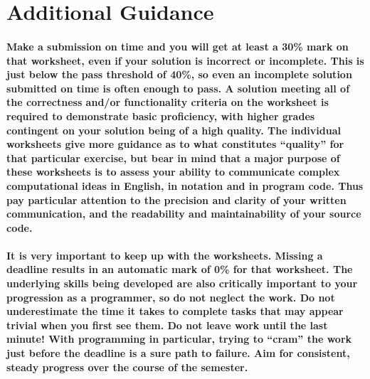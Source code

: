 \documentclass{../../fal_assignment}
\begin{document}
\paragraph{}

\section*{Additional Guidance}

\paragraph{Make a submission on time and you will get at least a 30\% mark on that worksheet,
even if your solution is incorrect or incomplete.
This is just below the pass threshold of 40\%, so even an incomplete solution submitted on time is often enough to pass.
A solution meeting all of the correctness and/or functionality criteria on the worksheet is required to demonstrate basic proficiency,
with higher grades contingent on your solution being of a high quality.
The individual worksheets give more guidance as to what constitutes ``quality'' for that particular exercise,
but bear in mind that a major purpose of these worksheets is to assess your ability to communicate
complex computational ideas in English, in notation and in program code.
Thus pay particular attention to the precision and clarity of your written communication,
and the readability and maintainability of your source code.}

\paragraph{It is very important to keep up with the worksheets. Missing a deadline results in an automatic mark of 0\% for that worksheet.
The underlying skills being developed are also critically important to your progression as a programmer, so do not neglect the work.
Do not underestimate the time it takes to complete tasks that may appear trivial when you first see them.
Do not leave work until the last minute! With programming in particular, trying to ``cram'' the work just before the deadline is a sure path to failure. Aim for consistent, steady progress over the course of the semester.}
\end{document}
